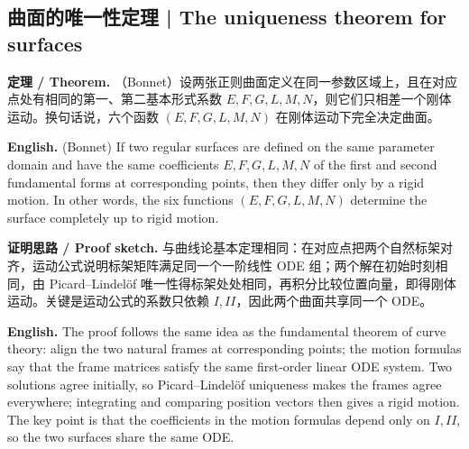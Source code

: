 \documentclass[UTF8,11pt,a4paper]{ctexart}
\newcommand{\EN}[1]{\par\noindent \textbf{English.} #1\par}
\newcommand{\THM}[2]{\par\noindent\textbf{定理 / Theorem.} #1\par\EN{#2}\par\smallskip}
\newcommand{\PROOF}[2]{\par\noindent\textbf{证明思路 / Proof sketch.} #1\par\EN{#2}\par\smallskip}
\begin{document}
\subsection{曲面的唯一性定理 | The uniqueness theorem for surfaces}
\THM{（Bonnet）设两张正则曲面定义在同一参数区域上，且在对应点处有相同的第一、第二基本形式系数 $E,F,G,L,M,N$，则它们只相差一个刚体运动。换句话说，六个函数 $(E,F,G,L,M,N)$ 在刚体运动下完全决定曲面。}{(Bonnet) If two regular surfaces are defined on the same parameter domain and have the same coefficients $E,F,G,L,M,N$ of the first and second fundamental forms at corresponding points, then they differ only by a rigid motion. In other words, the six functions $(E,F,G,L,M,N)$ determine the surface completely up to rigid motion.}
\PROOF{与曲线论基本定理相同：在对应点把两个自然标架对齐，运动公式说明标架矩阵满足同一个一阶线性 ODE 组；两个解在初始时刻相同，由 Picard--Lindelöf 唯一性得标架处处相同，再积分比较位置向量，即得刚体运动。关键是运动公式的系数只依赖 $I,II$，因此两个曲面共享同一个 ODE。}{The proof follows the same idea as the fundamental theorem of curve theory: align the two natural frames at corresponding points; the motion formulas say that the frame matrices satisfy the same first-order linear ODE system. Two solutions agree initially, so Picard--Lindelöf uniqueness makes the frames agree everywhere; integrating and comparing position vectors then gives a rigid motion. The key point is that the coefficients in the motion formulas depend only on $I,II$, so the two surfaces share the same ODE.}
\end{document}
